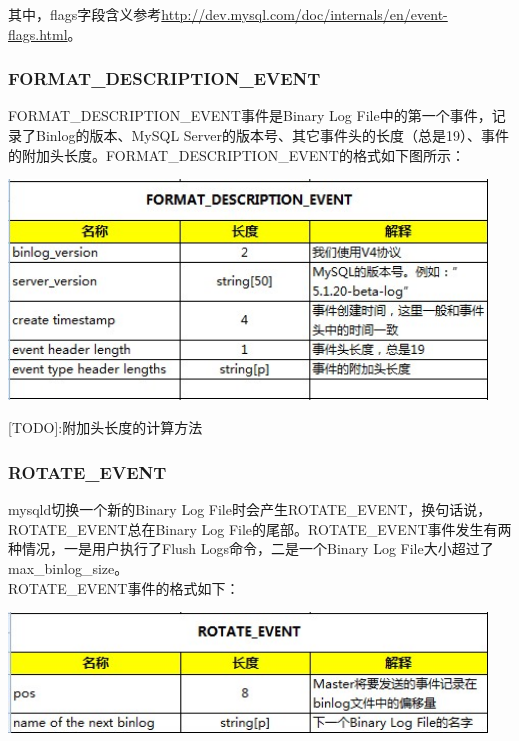 \documentclass[a4paper, titlepage, 10pt, bookmark]{article}
\begin{document}
其中，flags字段含义参考\url{http://dev.mysql.com/doc/internals/en/event-flags.html}。

\subsubsection{FORMAT\_DESCRIPTION\_EVENT}
FORMAT\_DESCRIPTION\_EVENT事件是Binary Log File中的第一个事件，记录了Binlog的版本、MySQL Server的版本号、其它事件头的长度（总是19）、事件的附加头长度。FORMAT\_DESCRIPTION\_EVENT的格式如下图所示：
\begin{center}
\includegraphics[width=5in]{021.jpg}
\end{center}

[TODO]:附加头长度的计算方法

\subsubsection{ROTATE\_EVENT}
mysqld切换一个新的Binary Log File时会产生ROTATE\_EVENT，换句话说，ROTATE\_EVENT总在Binary Log File的尾部。ROTATE\_EVENT事件发生有两种情况，一是用户执行了Flush Logs命令，二是一个Binary Log File大小超过了max\_binlog\_size。\\

ROTATE\_EVENT事件的格式如下：
\begin{center}
\includegraphics[width=5in]{022.jpg}
\end{center}
\end{document}

